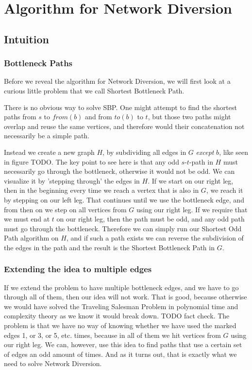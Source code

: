 \chapter{Algorithm for Network Diversion}

\section{Intuition}
\subsection{Bottleneck Paths}
Before we reveal the algorithm for Network Diversion, we will first look at a curious little problem that we call Shortest Bottleneck Path.


There is no obvious way to solve SBP. One might attempt to find the shortest paths from $s$ to $from(b)$ and from $to(b)$ to $t$, but those two paths might overlap and reuse the same vertices, and therefore would their concatenation not necessarily be a simple path.

Instead we create a new graph $H$, by subdividing all edges in $G$ \emph{except} $b$, like seen in figure TODO. The key point to see here is that any odd $s$-$t$-path in $H$ must necessarily go through the bottleneck, otherwise it would not be odd. We can visualize it by 'stepping through' the edges in $H$. If we start on our right leg, then in the beginning every time we reach a vertex that is also in $G$, we reach it by stepping on our left leg. That continues until we use the bottleneck edge, and from then on we step on all vertices from $G$ using our right leg. If we require that we must end at $t$ on our right leg, then the path must be odd, and any odd path must go through the bottleneck. Therefore we can simply run our Shortest Odd Path algorithm on $H$, and if such a path exists we can reverse the subdivision of the edges in the path and the result is the Shortest Bottleneck Path in $G$.

\subsection{Extending the idea to multiple edges}
If we extend the problem to have multiple bottleneck edges, and we have to go through all of them, then our idea will not work. That is good, because otherwise we would have solved the Traveling Salesman Problem in polynomial time and complexity theory as we know it would break down. TODO fact check.
The problem is that we have no way of knowing whether we have used the marked edges 1, or 3, or 5, etc. times, because in all of them we hit vertices from $G$ using our right leg. We can, however, use this idea to find paths that use a certain set of edges an odd amount of times. And as it turns out, that is exactly what we need to solve Network Diversion.

